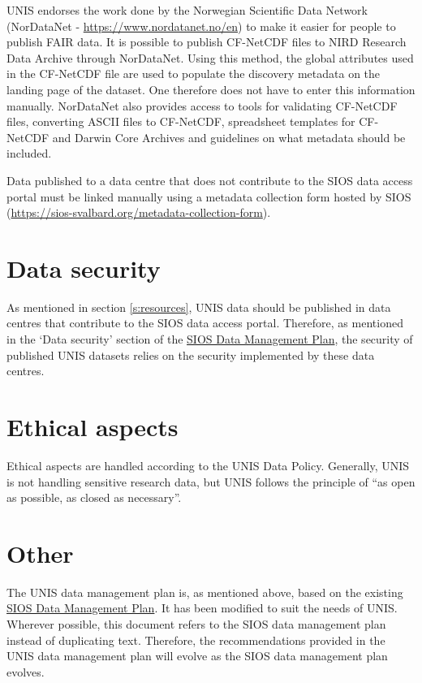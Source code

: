 \documentclass[a4paper,english, 11pt]{article}
\begin{document}
UNIS endorses the work done by the Norwegian Scientific Data Network (NorDataNet - \url{https://www.nordatanet.no/en}) to make it easier for people to publish FAIR data. It is possible to publish CF-NetCDF files to NIRD Research Data Archive through NorDataNet. Using this method, the global attributes used in the CF-NetCDF file are used to populate the discovery metadata on the landing page of the dataset. One therefore does not have to enter this information manually. NorDataNet also provides access to tools for validating CF-NetCDF files, converting ASCII files to CF-NetCDF, spreadsheet templates for CF-NetCDF and Darwin Core Archives and guidelines on what metadata should be included. 

Data published to a data centre that does not contribute to the SIOS data access portal must be linked manually using a metadata collection form hosted by SIOS (\url{https://sios-svalbard.org/metadata-collection-form}).  

\section{Data security}
\label{s:security}

As mentioned in section \ref{s:resources}, UNIS data should be published in data centres that contribute to the SIOS data access portal. Therefore, as mentioned in the `Data security' section of the \href{https://sios-svalbard.org/sites/sios-svalbard.org/files/common/SIOS_Data_Management_Plan.pdf}{SIOS Data Management Plan}, the security of published UNIS datasets relies on the security implemented by these data centres.

\section{Ethical aspects}
\label{s:ethics}

Ethical aspects are handled according to the UNIS Data Policy. Generally, UNIS is not handling sensitive research data, but UNIS follows the principle of ``as open as possible, as closed as necessary''.

\section{Other}
\label{s:other}

The UNIS data management plan is, as mentioned above, based on the existing \href{https://sios-svalbard.org/sites/sios-svalbard.org/files/common/SIOS_Data_Management_Plan.pdf}{SIOS Data Management Plan}. It has been modified to suit the needs of UNIS. Wherever possible, this document refers to the SIOS data management plan instead of duplicating text. Therefore, the recommendations provided in the UNIS data management plan will evolve as the SIOS data management plan evolves. 
\end{document}
